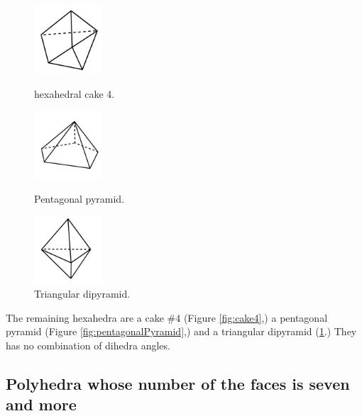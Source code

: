 \documentclass[suppldata, dvipdfmx]{interact}
\theoremstyle{plain}%
\theoremstyle{definition}
\theoremstyle{remark}
\theoremstyle{problemstyle}
\begin{document}
\begin{figure}[h!tbp]
  \begin{minipage}[t]{0.3\textwidth}
   \centering 
   \includegraphics[width=1in, height=1in,
   keepaspectratio]{./img/HexahedraWithSphericalFaces/otherPolyhedra/hexahedralCake4.jpg}
   \caption{hexahedral cake 4.}
   \label{fig:cake4}
  \end{minipage}
 \hspace*{\fill}
  \begin{minipage}[t]{0.3\textwidth}
   \centering
   \includegraphics[width=1in, height=1in,
   keepaspectratio]{./img/HexahedraWithSphericalFaces/otherPolyhedra/pentagonalPyramid.jpg}
   \caption{Pentagonal pyramid.}
   \label{fig:pentagonalPyramid}
  \end{minipage}
  \hspace*{\fill}
  \begin{minipage}[t]{0.3\textwidth}
   \centering
   \includegraphics[width=1in, height=1in,
   keepaspectratio]{./img/HexahedraWithSphericalFaces/otherPolyhedra/triangularDipyramid.jpg} 
   \caption{Triangular dipyramid.}
   \label{fig:triangularDipyramid}
  \end{minipage}
  \hspace*{\fill}
\end{figure}

The remaining hexahedra are a cake \#4 (Figure \ref{fig:cake4},) a pentagonal pyramid (Figure \ref{fig:pentagonalPyramid},) and a triangular dipyramid (\ref{fig:triangularDipyramid}.)  They has
no combination of dihedra angles.

\subsection{Polyhedra whose number of the faces is seven and more}
\end{document}
